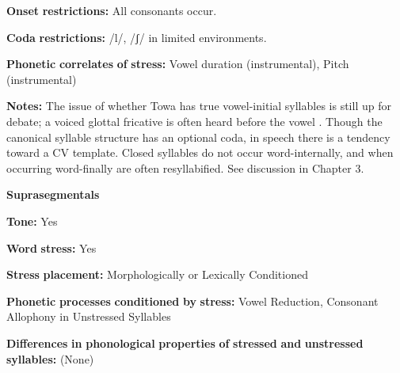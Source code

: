\documentclass[output=paper]{langsci/langscibook}
\begin{document}
\begin{styleBody}
\textbf{Onset} \textbf{restrictions:} All consonants occur.
\end{styleBody}

\begin{styleBody}
\textbf{Coda} \textbf{restrictions:} /l/, /ʃ/ in limited environments.
\end{styleBody}

\begin{styleBody}
\textbf{Phonetic} \textbf{correlates} \textbf{of} \textbf{stress:} Vowel duration (instrumental), Pitch (instrumental)
\end{styleBody}

\begin{styleBody}
\textbf{Notes:} The issue of whether Towa has true vowel-initial syllables is still up for debate; a voiced glottal fricative is often heard before the vowel \citep[22-23]{Yumitani1998}. Though the canonical syllable structure has an optional coda, in speech there is a tendency toward a CV template. Closed syllables do not occur word-internally, and when occurring word-finally are often resyllabified. See discussion in Chapter 3.
\end{styleBody}

\begin{styleBody}
\textbf{Suprasegmentals}
\end{styleBody}

\begin{styleBody}
\textbf{Tone:} Yes
\end{styleBody}

\begin{styleBody}
\textbf{Word} \textbf{stress:} Yes
\end{styleBody}

\begin{styleBody}
\textbf{Stress} \textbf{placement:} Morphologically or Lexically Conditioned
\end{styleBody}

\begin{styleBody}
\textbf{Phonetic} \textbf{processes} \textbf{conditioned} \textbf{by} \textbf{stress:} Vowel Reduction, Consonant Allophony in Unstressed Syllables
\end{styleBody}

\begin{styleBody}
\textbf{Differences} \textbf{in} \textbf{phonological} \textbf{properties} \textbf{of} \textbf{stressed} \textbf{and} \textbf{unstressed} \textbf{syllables:} (None)
\end{styleBody}
\end{document}
